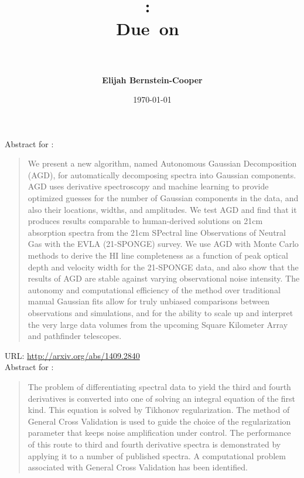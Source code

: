 \documentclass[11pt]{article}
\title{\vspace{0in}
    \textmd{\textbf{\hmwkClass:\ \hmwkTitle}}\\
    \normalsize\vspace{0.1in}\small{Due\ on\ \hmwkDueDate}\\
    \vspace{0.1in}\large{\textit{\hmwkClassInstructor\ \hmwkClassTime}}
    \vspace{0.2in}}
\author{\textbf{Elijah Bernstein-Cooper}}
\date{\today} %
\begin{document}
\maketitle

\begin{homeworkProblem}

    Abstract for \citet{lindner:vera-ciro:murray:stanimirovic:2014}:

    \begin{quote}

        We present a new algorithm, named Autonomous Gaussian Decomposition
        (AGD), for automatically decomposing spectra into Gaussian components.
        AGD uses derivative spectroscopy and machine learning to provide
        optimized guesses for the number of Gaussian components in the data,
        and also their locations, widths, and amplitudes. We test AGD and find
        that it produces results comparable to human-derived solutions on 21cm
        absorption spectra from the 21cm SPectral line Observations of Neutral
        Gas with the EVLA (21-SPONGE) survey. We use AGD with Monte Carlo
        methods to derive the HI line completeness as a function of peak
        optical depth and velocity width for the 21-SPONGE data, and also show
        that the results of AGD are stable against varying observational noise
        intensity. The autonomy and computational efficiency of the method over
        traditional manual Gaussian fits allow for truly unbiased comparisons
        between observations and simulations, and for the ability to scale up
        and interpret the very large data volumes from the upcoming Square
        Kilometer Array and pathfinder telescopes.
        
    \end{quote}

    URL: \url{http://arxiv.org/abs/1409.2840} \\

    \clearpage
    Abstract for \citet{yeow:azali:ow:wong:2005}:
    
    \begin{quote}
        
        The problem of differentiating spectral data to yield the third and
        fourth derivatives is converted into one of solving an integral
        equation of the first kind. This equation is solved by Tikhonov
        regularization. The method of General Cross Validation is used to guide
        the choice of the regularization parameter that keeps noise
        amplification under control. The performance of this route to third and
        fourth derivative spectra is demonstrated by applying it to a number of
        published spectra. A computational problem associated with General
        Cross Validation has been identified.


\end{quote}
\end{homeworkProblem}
\end{document}
